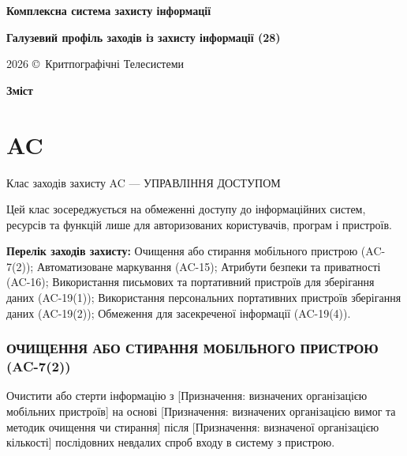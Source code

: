 \documentclass{article}
\newcommand\HUGE[1]{\fontsize{40}{40}\selectfont #1}
\begin{document}
\pagestyle{fancy}

\begin{titlepage}
  \AddToShipoutPictureBG*{\AtPageLowerLeft{\color{nato}\rule{\paperwidth}{\paperheight}}}
  \color{white}\thispagestyle{empty}\vspace*{4cm}\centering
  {\Huge  \textbf{Комплексна система захисту інформації} \par} \vspace{2cm}
  {\HUGE  \textbf{Галузевий профіль заходів із захисту інформації (28)} \par} \vspace{2.5cm}
  \vfill
  {\large 2026 \copyright\ Критпографічні Телесистеми \par}
\end{titlepage}

\newpage

\begin{center}
  {\Huge\color{nato}\bfseries Зміст\par}
\end{center}
\vspace{40pt}
\tableofcontents

\begin{abstract}
Галузевий профіль — розробляється галузевим органом, погоджується з Держспецзв’язку та затверджується наказом/рішенням відповідного органу. Включає лише додаткові вимоги (відмінності) відносно Базового профілю.
\end{abstract}

\section{AC}
Клас заходів захисту AC --- УПРАВЛІННЯ ДОСТУПОМ

Цей клас зосереджується на обмеженні доступу до інформаційних систем, ресурсів та функцій лише для авторизованих користувачів, програм і пристроїв.

\textbf{Перелік заходів захисту:} Очищення або стирання мобільного пристрою (AC-7(2)); Автоматизоване маркування (AC-15); Атрибути безпеки та приватності (AC-16); Використання письмових та портативний пристроїв для зберігання даних (AC-19(1)); Використання персональних портативних пристроїв зберігання даних (AC-19(2)); Обмеження для засекреченої інформації (AC-19(4)).

\subsubsection{ОЧИЩЕННЯ АБО СТИРАННЯ МОБІЛЬНОГО ПРИСТРОЮ (AC-7(2))}
Очистити або стерти інформацію з [Призначення: визначених організацією мобільних пристроїв] на основі [Призначення: визначених організацією вимог та методик очищення чи стирання] після [Призначення: визначеної організацією кількості] послідовних невдалих спроб входу в систему з пристрою.
\end{document}
